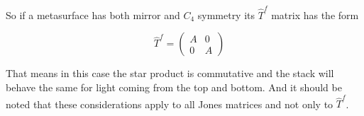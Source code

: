 So if a metasurface has both mirror and $C_4$ symmetry its $\hat T^f$ matrix has the form

\begin{equation}
    \quad
    \hat T^f =
    \begin{pmatrix}
        A & 0 \\
        0 & A
    \end{pmatrix}
\end{equation}

That means in this case the star product is commutative and the stack will behave the same for light coming from the top and bottom.
And it should be noted that these considerations apply to all Jones matrices and not only to $\hat T^f$.
